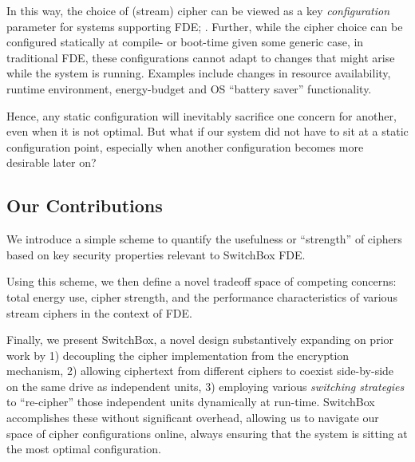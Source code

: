 In this way, the choice of (stream) cipher can be viewed as a key
\emph{configuration} parameter for systems supporting FDE; . Further, while the
cipher choice can be configured statically at compile- or boot-time given some
generic case, in traditional FDE, these configurations cannot adapt to changes
that might arise while the system is running. Examples include changes in
resource availability, runtime environment, energy-budget and OS ``battery
saver'' functionality.

Hence, any static configuration will inevitably sacrifice one concern for
another, even when it is not optimal. But what if our system did not have to sit
at a static configuration point, especially when another configuration becomes
more desirable later on?

\subsection{Our Contributions}

We introduce a simple scheme to quantify the usefulness or ``strength'' of ciphers based on key security properties
relevant to SwitchBox FDE.

Using this scheme, we then define a novel tradeoff space of competing concerns:
total energy use, cipher strength, and the performance characteristics of
various stream ciphers in the context of FDE.

Finally, we present SwitchBox, a novel design substantively expanding on prior
work by 1) decoupling the cipher implementation from the encryption mechanism,
2) allowing ciphertext from different ciphers to coexist side-by-side on the
same drive as independent units, 3) employing various \emph{switching
strategies} to ``re-cipher'' those independent units dynamically at run-time.
SwitchBox accomplishes these without significant overhead, allowing us to
navigate our space of cipher configurations online, always ensuring that the
system is sitting at the most optimal configuration.


